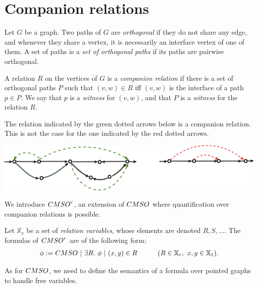 \section{Companion relations}\label{sec:comp-rel}



 


\begin{definition} Let $G$ be a graph. 
Two paths  of $G$ are \emph{orthogonal} if they do not share any edge, and whenever they share a vertex, it is necessarily an interface vertex of one of them. A set of paths is a \emph{set of orthogonal paths} if its paths are pairwise orthogonal.

A relation $R$ on the vertices of $G$ is a \emph{companion relation} if there is a set of orthogonal paths $P$ such that $(v,w)\in R$ iff $(v,w)$ is the interface of a path $p\in P$. We say that $p$ is a \emph{witness} for $(v,w)$, and that $P$ is a \emph{witness} for the relation $R$.
\end{definition}

\begin{example} \label{ex:guared-set-of-paths}
The relation indicated by the green dotted arrows below is a companion relation. This is not the case for the one indicated by the red dotted arrows.
\begin{center}
\includegraphics[scale=.4]{Pictures/guarded-set-of-paths}
\end{center}
 \end{example}

We introduce $\CMSO^r$, an extension of $\CMSO$ where quantification over companion relations is possible.

\begin{definition} 
  Let $\mathbb{X}_r$ be a set of \emph{relation variables}, whose elements are denoted $R, S, \dots$. The formulas of $\CMSO^r$ are of the following form:
\begin{align*}
 \phi :=&\ \CMSO\ |\ \exists R.\ \phi\ |\ (x,y)\in R & \qquad (R\in \mathbb{X}_r,\ x,y\in\mathbb{X}_1).
\end{align*}
\end{definition}
 
 As for $\CMSO$, we need to define the semantics of a formula over pointed graphs to handle free variables.
 
